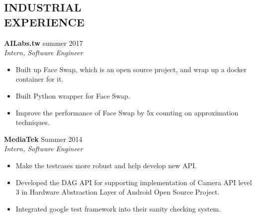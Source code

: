 \documentclass[margin, 9pt]{res} %
\begin{document}
\begin{resume}
\section{INDUSTRIAL\\ EXPERIENCE}

{\textbf{AILabs.tw}} \hfill{summer 2017}\\
{\textit{Intern, Software Engineer}}
\begin{itemize}[leftmargin=*] \itemsep -3pt
\vspace*{-5pt}
  \item Built up Face Swap, which is an open source project, and wrap up a docker
  container for it.
	\item Built Python wrapper for Face Swap.
	\item Improve the performance of Face Swap by 5x counting on approximation
  techniques.
\end{itemize}

\medskip
{\textbf{MediaTek}} \hfill{Summer 2014}\\
{\textit{Intern, Software Engineer}}
\begin{itemize}[leftmargin=*] \itemsep -3pt
\vspace*{-5pt}
  \item Make the testcases more robust and help develop new API.
	\item Developed the DAG API for supporting implementation of Camera API level
  3 in Hardware Abstraction Layer of Android Open Source Project.
	\item Integrated google test framework into their sanity checking system.
\end{itemize}


\end{resume}
\end{document}
